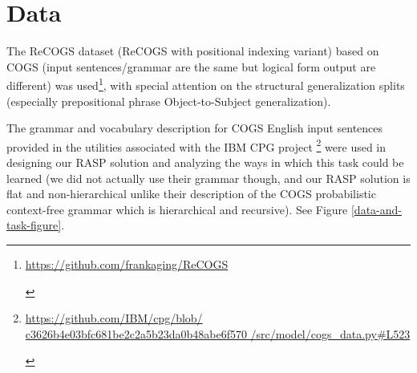 \documentclass[11pt]{article}
\begin{document}
%
%
%

\section{Data}

The ReCOGS \cite{Wu2023} dataset (ReCOGS with positional indexing variant) based on COGS \cite{KimLinzen2020} (input sentences/grammar are the same but logical form output are different) was used\footnote{\begin{footnotesize}\href{https://github.com/frankaging/ReCOGS}{https://github.com/frankaging/ReCOGS}
\end{footnotesize}}, with special attention on the structural generalization splits (especially prepositional phrase Object-to-Subject generalization).

The grammar and vocabulary description for COGS English input sentences provided in the utilities associated with the IBM CPG project \cite{klinger2024compositionalprogramgenerationfewshot}\footnote{\begin{footnotesize}\href{https://github.com/IBM/cpg/blob/c3626b4e03bfc681be2c2a5b23da0b48abe6f570/src/model/cogs\_data.py\#L523}{https://github.com/IBM/cpg/blob/
c3626b4e03bfc681be2c2a5b23da0b48abe6f570
/src/model/cogs\_data.py\#L523}
\end{footnotesize}}
were used in designing our RASP solution and analyzing the ways in which this task could be learned (we did not actually use their grammar though, and our RASP solution is flat and non-hierarchical unlike their description of the COGS probabilistic context-free grammar which is hierarchical and recursive). See Figure \ref{data-and-task-figure}.
\end{document}
